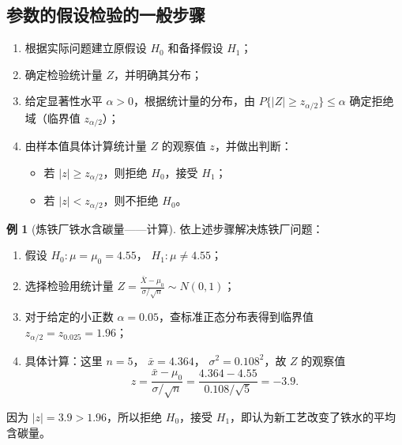 \documentclass[11pt,a4paper]{report}
\theoremstyle{definition}
\newtheorem{example}{例}[chapter]
\begin{document}
\subsection{参数的假设检验的一般步骤}

\begin{enumerate}[label=\arabic*.,leftmargin=2em]
    \item 根据实际问题建立原假设 $H_{0}$ 和备择假设 $H_{1}$；
    \item 确定检验统计量 $Z$，并明确其分布；
    \item 给定显著性水平 $\alpha>0$，根据统计量的分布，由 $P\{|Z|\geq z_{\alpha/2}\}\leq\alpha$ 确定拒绝域（临界值 $z_{\alpha/2}$）；
    \item 由样本值具体计算统计量 $Z$ 的观察值 $z$，并做出判断：
    \begin{itemize}
        \item 若 $|z|\geq z_{\alpha/2}$，则拒绝 $H_{0}$，接受 $H_{1}$；
        \item 若 $|z|<z_{\alpha/2}$，则不拒绝 $H_{0}$。
    \end{itemize}
\end{enumerate}

\begin{example}[炼铁厂铁水含碳量——计算]
依上述步骤解决炼铁厂问题：
\begin{enumerate}[label=\arabic*.,leftmargin=2em]
    \item 假设 $H_{0}\colon\mu=\mu_{0}=4.55$， $H_{1}\colon\mu\neq 4.55$；
    \item 选择检验用统计量 $Z=\frac{\bar{X}-\mu_{0}}{\sigma/\sqrt{n}}\sim N(0,1)$；
    \item 对于给定的小正数 $\alpha=0.05$，查标准正态分布表得到临界值 $z_{\alpha/2}=z_{0.025}=1.96$；
    \item 具体计算：这里 $n=5$， $\bar{x}=4.364$， $\sigma^{2}=0.108^{2}$，故 $Z$ 的观察值
    \[
    z=\frac{\bar{x}-\mu_{0}}{\sigma/\sqrt{n}}=\frac{4.364-4.55}{0.108/\sqrt{5}}=-3.9.
    \]
\end{enumerate}
因为 $|z|=3.9>1.96$，所以拒绝 $H_{0}$，接受 $H_{1}$，即认为新工艺改变了铁水的平均含碳量。
\end{example}
\end{document}

